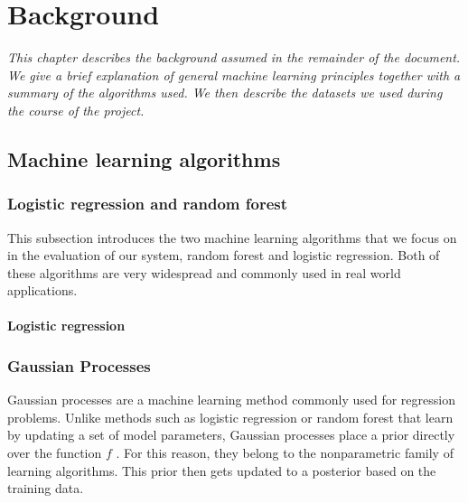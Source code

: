 \documentclass[a4paper,12pt,twoside,openright]{report}
\begin{document}
\chapter{Background}
\textit{This chapter describes the background assumed in the remainder of the document. We give a brief explanation of general machine learning principles together with a summary of the algorithms used. We then describe the datasets we used during the course of the project.}









\section{Machine learning algorithms}
\subsection{Logistic regression and random forest}
This subsection introduces the two machine learning algorithms that we focus on in the evaluation of our system, random forest and logistic regression. Both of these algorithms are very widespread and commonly used in real world applications. %


\subsubsection{Logistic regression}



\subsection{Gaussian Processes}
Gaussian processes are a machine learning method commonly used for regression problems. Unlike methods such as logistic regression or random forest that learn by updating a set of model parameters, Gaussian processes place a prior directly over the function $f$ \cite{Murphy:2012:MLP:2380985}. For this reason, they belong to the nonparametric family of learning algorithms. This prior then gets updated to a posterior based on the training data.
\end{document}
